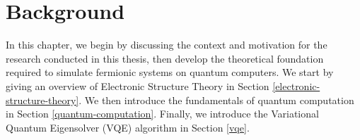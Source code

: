 \chapter{Background}%
\label{background}

In this chapter, we begin by discussing the context and motivation for the research conducted in this thesis, then develop the theoretical foundation required to simulate fermionic systems on quantum computers. We start by giving an overview of Electronic Structure Theory in Section \ref{electronic-structure-theory}. We then introduce the fundamentals of quantum computation in Section \ref{quantum-computation}. Finally, we introduce the Variational Quantum Eigensolver (VQE) algorithm in Section \ref{vqe}.
